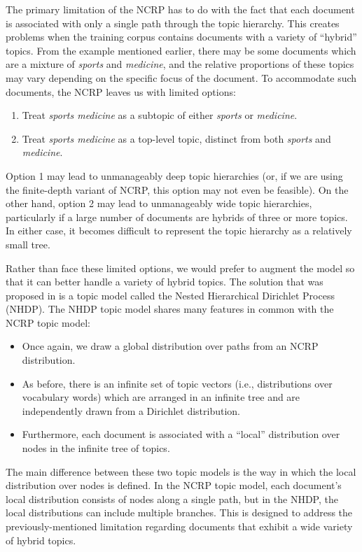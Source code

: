 \documentclass{article}
\begin{document}
The primary limitation of the NCRP has to do with the fact that each document is associated with only a single path through the topic hierarchy.
This creates problems when the training corpus contains documents with a variety of ``hybrid'' topics.
From the example mentioned earlier, there may be some documents which are a mixture of \emph{sports} and \emph{medicine}, and the relative proportions of these topics may vary depending on the specific focus of the document.
To accommodate such documents, the NCRP leaves us with limited options:
\begin{enumerate}
\item Treat \emph{sports medicine} as a subtopic of either \emph{sports} or \emph{medicine}.
\item Treat \emph{sports medicine} as a top-level topic, distinct from both \emph{sports} and \emph{medicine}.
\end{enumerate}
Option 1 may lead to unmanageably deep topic hierarchies (or, if we are using the finite-depth variant of NCRP, this option may not even be feasible).
On the other hand, option 2 may lead to unmanageably wide topic hierarchies, particularly if a large number of documents are hybrids of three or more topics.
In either case, it becomes difficult to represent the topic hierarchy as a relatively small tree.

Rather than face these limited options, we would prefer to augment the model so that it can better handle a variety of hybrid topics.
The solution that was proposed in \cite{paisley2015nhdp} is a topic model called the Nested Hierarchical Dirichlet Process (NHDP).
The NHDP topic model shares many features in common with the NCRP topic model:
\begin{itemize}
\item Once again, we draw a global distribution over paths from an NCRP distribution.
\item As before, there is an infinite set of topic vectors (i.e., distributions over vocabulary words) which are arranged in an infinite tree and are independently drawn from a Dirichlet distribution.
\item Furthermore, each document is associated with a ``local'' distribution over nodes in the infinite tree of topics.
\end{itemize}
The main difference between these two topic models is the way in which the local distribution over nodes is defined.
In the NCRP topic model, each document's local distribution consists of nodes along a single path, but in the NHDP, the local distributions can include multiple branches.
This is designed to address the previously-mentioned limitation regarding documents that exhibit a wide variety of hybrid topics.
\end{document}
